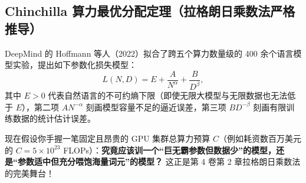 \subsection{Chinchilla 算力最优分配定理（拉格朗日乘数法严格推导）}

DeepMind 的 Hoffmann 等人（2022）拟合了跨五个算力数量级的 400 余个语言模型实验，提出如下参数化损失模型：
\begin{equation}
  L(N, D) = E + \frac{A}{N^\alpha} + \frac{B}{D^\beta},
  \label{eq:chinchilla-loss}
\end{equation}
其中 $E > 0$ 代表自然语言的不可约熵下限（即使无限大模型与无限数据也无法低于 $E$），第二项 $A N^{-\alpha}$ 刻画模型容量不足的逼近误差，第三项 $B D^{-\beta}$ 刻画有限训练数据的统计估计误差。

现在假设你手握一笔固定且昂贵的 GPU 集群总算力预算 $C$（例如耗资数百万美元的 $C = 5 \times 10^{23}$ FLOPs）：\textbf{究竟应该训一个“巨无霸参数但数据少”的模型，还是“参数适中但充分喂饱海量词元”的模型？} 这正是第 4 卷第 2 章拉格朗日乘数法的完美舞台！

